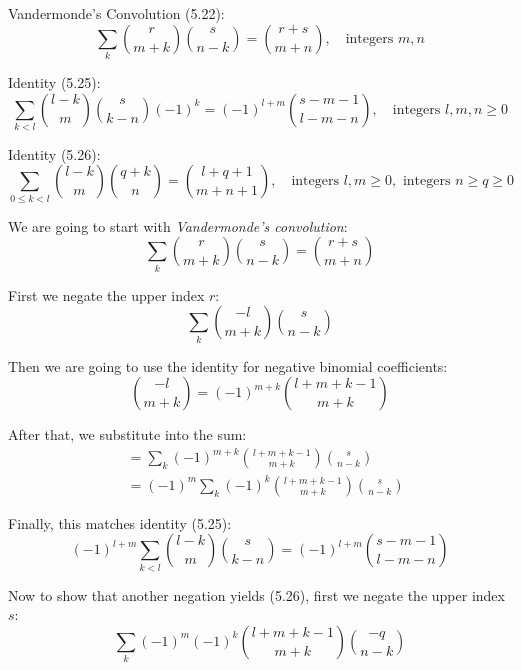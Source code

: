 \documentclass[12pt]{article}
\begin{document}
Vandermonde's Convolution (5.22):
\begin{equation}
    \sum_{k} \binom{r}{m+k} \binom{s}{n-k} = \binom{r+s}{m+n}, \quad \text{integers } m, n
\end{equation}

Identity (5.25):
\begin{equation}
    \sum_{k < l} \binom{l-k}{m} \binom{s}{k-n} {(-1)}^k = {(-1)}^{l+m} \binom{s-m-1}{l-m-n}, \quad \text{integers } l, m, n \geq 0
\end{equation}

Identity (5.26):
\begin{equation}
    \sum_{0 \le k < l} \binom{l-k}{m} \binom{q+k}{n} = \binom{l+q+1}{m+n+1}, \quad \text{integers } l, m \geq 0, \text{ integers } n \geq q \geq 0
\end{equation}

We are going to start with \textit{Vandermonde's convolution}:
\begin{equation}
    \sum_{k} \binom{r}{m+k} \binom{s}{n-k} = \binom{r+s}{m+n}
\end{equation}

First we negate the upper index \( r \):
\begin{equation}
    \sum_{k} \binom{-l}{m+k} \binom{s}{n-k}
\end{equation}

Then we are going to use the identity for negative binomial coefficients:
\begin{equation}
    \binom{-l}{m+k} = {(-1)}^{m+k} \binom{l+m+k-1}{m+k}
\end{equation}

After that, we substitute into the sum:
\begin{align*}
    &= \sum_{k} {(-1)}^{m+k} \binom{l+m+k-1}{m+k} \binom{s}{n-k} \\
    &= {(-1)}^m \sum_{k} {(-1)}^k \binom{l+m+k-1}{m+k} \binom{s}{n-k}
\end{align*}

Finally, this matches identity (5.25):
\begin{equation}
    {(-1)}^{l+m} \sum_{k < l} \binom{l-k}{m} \binom{s}{k-n} = {(-1)}^{l+m} \binom{s-m-1}{l-m-n}
\end{equation}

Now to show that another negation yields (5.26), first we negate the upper index \( s \):
\begin{equation}
    \sum_{k} {(-1)}^m {(-1)}^k \binom{l+m+k-1}{m+k} \binom{-q}{n-k}
\end{equation}
\end{document}
